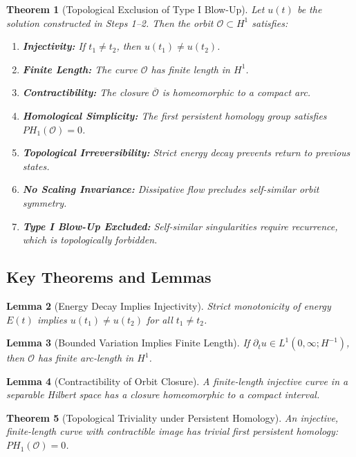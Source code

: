 \documentclass[11pt]{article}
\newtheorem{theorem}{Theorem}[section]
\newtheorem{lemma}[theorem]{Lemma}
\theoremstyle{definition}
\begin{document}
\begin{theorem}[Topological Exclusion of Type I Blow-Up]
\label{thm:typeI_exclusion}
Let $u(t)$ be the solution constructed in Steps 1--2. Then the orbit $\mathcal{O} \subset H^1$ satisfies:
\begin{enumerate}
  \item \textbf{Injectivity:} If $t_1 \ne t_2$, then $u(t_1) \ne u(t_2)$.
  \item \textbf{Finite Length:} The curve $\mathcal{O}$ has finite length in $H^1$.
  \item \textbf{Contractibility:} The closure $\overline{\mathcal{O}}$ is homeomorphic to a compact arc.
  \item \textbf{Homological Simplicity:} The first persistent homology group satisfies $PH_1(\mathcal{O}) = 0$.
  \item \textbf{Topological Irreversibility:} Strict energy decay prevents return to previous states.
  \item \textbf{No Scaling Invariance:} Dissipative flow precludes self-similar orbit symmetry.
  \item \textbf{Type I Blow-Up Excluded:} Self-similar singularities require recurrence, which is topologically forbidden.
\end{enumerate}
\end{theorem}

\subsection*{Key Theorems and Lemmas}
\begin{lemma}[Energy Decay Implies Injectivity]
Strict monotonicity of energy $E(t)$ implies $u(t_1) \ne u(t_2)$ for all $t_1 \ne t_2$.
\end{lemma}

\begin{lemma}[Bounded Variation Implies Finite Length]
If $\partial_t u \in L^1(0,\infty; H^{-1})$, then $\mathcal{O}$ has finite arc-length in $H^1$.
\end{lemma}

\begin{lemma}[Contractibility of Orbit Closure]
A finite-length injective curve in a separable Hilbert space has a closure homeomorphic to a compact interval.
\end{lemma}

\begin{theorem}[Topological Triviality under Persistent Homology]
An injective, finite-length curve with contractible image has trivial first persistent homology: $PH_1(\mathcal{O}) = 0$.
\end{theorem}
\end{document}
